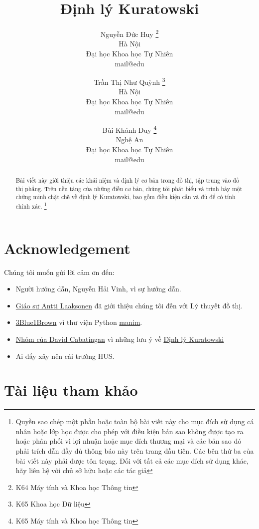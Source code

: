 \documentclass[12pt]{article}
\title{\textbf{Định lý Kuratowski}}
\author{
    Nguyễn Đức Huy \thanks{K64 Máy tính và Khoa học Thông tin}\\
    Hà Nội \\
    Đại học Khoa học Tự Nhiên \\
    mail@edu
    \and
    Trần Thị Như Quỳnh \thanks{K65 Khoa học Dữ liệu} \\
    Hà Nội \\
    Đại học Khoa học Tự Nhiên \\
    mail@edu
    \and
    Bùi Khánh Duy \thanks{K65 Máy tính và Khoa học Thông tin}\\
    Nghệ An \\
    Đại học Khoa học Tự Nhiên \\
    mail@edu
}
\begin{document}
\begin{titlepage}
    \maketitle
    \begin{abstract}
        Bài viết này giới thiệu các khái niệm và định lý cơ bản trong đồ thị, tập trung vào đồ thị phẳng. Trên nền tảng của những điều cơ bản, chúng tôi phát biểu và trình bày một chứng minh chặt chẽ về định lý Kuratowski, bao gồm điều kiện cần và đủ để có tính chính xác. \footnote{Quyền sao chép một phần hoặc toàn bộ bài viết này cho mục đích sử dụng cá nhân hoặc lớp học được cho phép với điều kiện bản sao không được tạo ra hoặc phân phối vì lợi nhuận hoặc mục đích thương mại và các bản sao đó phải trích dẫn đầy đủ thông báo này trên trang đầu tiên. Các bên thứ ba của bài viết này phải được tôn trọng. Đối với tất cả các mục đích sử dụng khác, hãy liên hệ với chủ sở hữu hoặc các tác giả}
    \end{abstract}
\end{titlepage}

\begin{titlepage}
    \tableofcontents
\end{titlepage}







\section*{Acknowledgement}
Chúng tôi muốn gửi lời cảm ơn đến:
\begin{itemize}
    \item Người hướng dẫn, Nguyễn Hải Vinh, vì sự hướng dẫn.
    \item \href{https://cses.fi/book/book.pdf}{Giáo sư Antti Laaksonen} đã giới thiệu chúng tôi đến với Lý thuyết đồ thị.
    \item \href{https://www.youtube.com/channel/UCYO_jab_esuFRV4b17AJtAw}{3Blue1Brown} vì thư viện Python \href{https://github.com/dcabatin/manim}{manim}.
    \item \href{https://www.youtube.com/watch?v=DOnY6eZi2E8}{Nhóm của David Cabatingan} vì những lưu ý về \hyperref[thr:kuratowski]{Định lý Kuratowski}
    \item Ai đấy xây nên cái trường HUS.
\end{itemize}
\section*{Tài liệu tham khảo}
\end{document}
